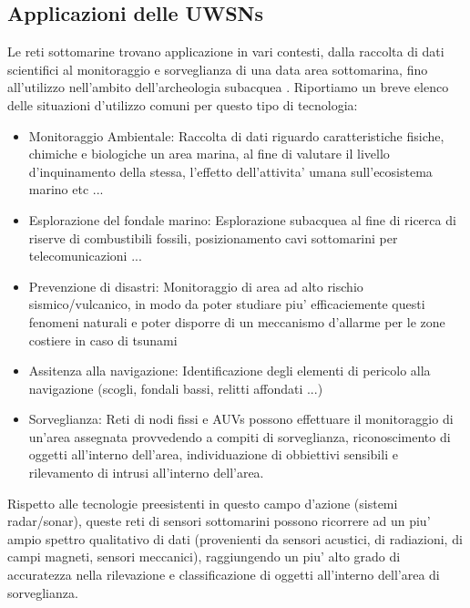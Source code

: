 \subsection{Applicazioni delle UWSNs}
Le reti sottomarine trovano applicazione in vari contesti, dalla raccolta di dati scientifici al monitoraggio e sorveglianza di una data area sottomarina, fino all'utilizzo nell'ambito dell'archeologia subacquea \cite{}.\newline
Riportiamo un breve elenco delle situazioni d'utilizzo comuni per questo tipo di tecnologia:\newline
\begin{itemize}
\item Monitoraggio Ambientale:  \newline
Raccolta di dati riguardo caratteristiche fisiche, chimiche e biologiche un area marina, al fine di valutare il livello d'inquinamento della stessa, l'effetto dell'attivita' umana sull'ecosistema marino etc ...\newline
\item Esplorazione del fondale marino: \newline
Esplorazione subacquea al fine di ricerca di riserve di combustibili fossili, posizionamento cavi sottomarini per telecomunicazioni ...\newline
\item Prevenzione di disastri:\newline
Monitoraggio di area ad alto rischio sismico/vulcanico, in modo da poter studiare piu' efficaciemente questi fenomeni naturali e poter disporre di un meccanismo d'allarme per le zone costiere in caso di tsunami\newline
\item Assitenza alla navigazione: \newline
Identificazione degli elementi di pericolo alla navigazione (scogli, fondali bassi, relitti affondati ...)\newline
\item Sorveglianza:\newline
Reti di nodi fissi e AUVs possono effettuare il monitoraggio di un'area assegnata provvedendo a compiti di sorveglianza, riconoscimento di oggetti all'interno dell'area, individuazione di obbiettivi sensibili e rilevamento di intrusi all'interno dell'area.
\end{itemize}
Rispetto alle tecnologie preesistenti in questo campo d'azione (sistemi radar/sonar), queste reti di sensori sottomarini possono ricorrere ad un piu' ampio spettro qualitativo di dati (provenienti da sensori acustici, di radiazioni, di campi magneti, sensori meccanici), raggiungendo un piu' alto grado di accuratezza nella rilevazione e classificazione di oggetti all'interno dell'area di sorveglianza.\newline

